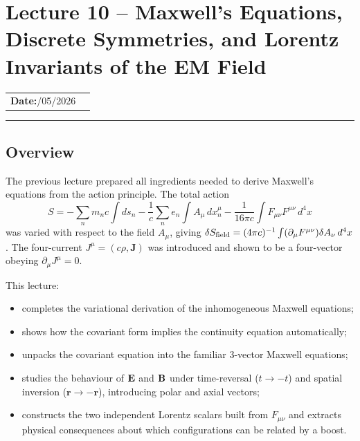 \section{Lecture 10 -- Maxwell's Equations, Discrete Symmetries, and Lorentz Invariants of the EM Field}\label{sec:lec10}

\begin{center}
\begin{tabular}{ll}
  \textbf{Date:}\quad 10/05/2026 & \\
\end{tabular}
\end{center}
\hrule\vspace{1.5em}

\subsection*{Overview}

The previous lecture prepared all ingredients needed to derive Maxwell's equations from the action
principle.  The total action
\begin{equation}\label{eq:lec10:total-action}
  S = -\sum_n m_n c\int ds_n
  -\frac{1}{c}\sum_n e_n\int A_\mu\,dx_n^\mu
  -\frac{1}{16\pi c}\int F_{\mu\nu}F^{\mu\nu}\,d^4x
\end{equation}
was varied with respect to the field $A_\mu$, giving $\delta S_{\rm field}=(4\pi c)^{-1}\int(\partial_\mu F^{\mu\nu})\delta A_\nu\,d^4x$.
The four-current $J^\mu=(c\rho,\mathbf{J})$ was introduced and shown to be a four-vector obeying
$\partial_\mu J^\mu=0$.

This lecture:
\begin{itemize}
  \item completes the variational derivation of the inhomogeneous Maxwell equations;
  \item shows how the covariant form implies the continuity equation automatically;
  \item unpacks the covariant equation into the familiar 3-vector Maxwell equations;
  \item studies the behaviour of $\mathbf{E}$ and $\mathbf{B}$ under time-reversal ($t\to-t$) and spatial
        inversion ($\mathbf{r}\to-\mathbf{r}$), introducing polar and axial vectors;
  \item constructs the two independent Lorentz scalars built from $F_{\mu\nu}$ and extracts
        physical consequences about which configurations can be related by a boost.
\end{itemize}

